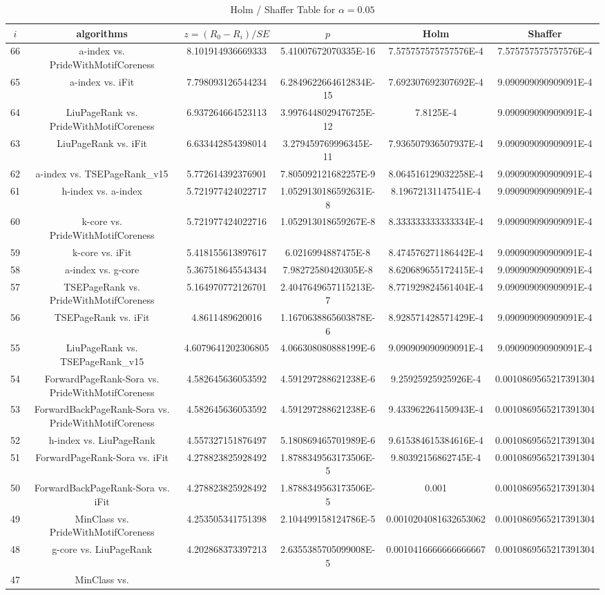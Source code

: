\documentclass[a4paper,10pt]{article}
\begin{document}
\begin{landscape}
\begin{table}[!htp]
\centering\tiny
\caption{Holm / Shaffer Table for $\alpha=0.05$}
\begin{tabular}{cccccc}
$i$&algorithms&$z=(R_0 - R_i)/SE$&$p$&Holm&Shaffer\\
\hline
66&a-index vs. PrideWithMotifCoreness&8.101914936669333&5.41007672070335E-16&7.575757575757576E-4&7.575757575757576E-4\\65&a-index vs. iFit&7.798093126544234&6.2849622664612834E-15&7.692307692307692E-4&9.090909090909091E-4\\64&LiuPageRank vs. PrideWithMotifCoreness&6.937264664523113&3.9976448029476725E-12&7.8125E-4&9.090909090909091E-4\\63&LiuPageRank vs. iFit&6.633442854398014&3.279459769996345E-11&7.936507936507937E-4&9.090909090909091E-4\\62&a-index vs. TSEPageRank_v15&5.772614392376901&7.805092121682257E-9&8.064516129032258E-4&9.090909090909091E-4\\61&h-index vs. a-index&5.721977424022717&1.0529130186592631E-8&8.19672131147541E-4&9.090909090909091E-4\\60&k-core vs. PrideWithMotifCoreness&5.721977424022716&1.052913018659267E-8&8.333333333333334E-4&9.090909090909091E-4\\59&k-core vs. iFit&5.418155613897617&6.0216994887475E-8&8.474576271186442E-4&9.090909090909091E-4\\58&a-index vs. g-core&5.367518645543434&7.98272580420305E-8&8.620689655172415E-4&9.090909090909091E-4\\57&TSEPageRank vs. PrideWithMotifCoreness&5.164970772126701&2.4047649657115213E-7&8.771929824561404E-4&9.090909090909091E-4\\56&TSEPageRank vs. iFit&4.8611489620016&1.1670638865603878E-6&8.928571428571429E-4&9.090909090909091E-4\\55&LiuPageRank vs. TSEPageRank_v15&4.6079641202306805&4.066308080888199E-6&9.090909090909091E-4&9.090909090909091E-4\\54&ForwardPageRank-Sora vs. PrideWithMotifCoreness&4.582645636053592&4.591297288621238E-6&9.25925925925926E-4&0.0010869565217391304\\53&ForwardBackPageRank-Sora vs. PrideWithMotifCoreness&4.582645636053592&4.591297288621238E-6&9.433962264150943E-4&0.0010869565217391304\\52&h-index vs. LiuPageRank&4.557327151876497&5.180869465701989E-6&9.615384615384616E-4&0.0010869565217391304\\51&ForwardPageRank-Sora vs. iFit&4.278823825928492&1.8788349563173506E-5&9.80392156862745E-4&0.0010869565217391304\\50&ForwardBackPageRank-Sora vs. iFit&4.278823825928492&1.8788349563173506E-5&0.001&0.0010869565217391304\\49&MinClass vs. PrideWithMotifCoreness&4.253505341751398&2.104499158124786E-5&0.0010204081632653062&0.0010869565217391304\\48&g-core vs. LiuPageRank&4.202868373397213&2.6355385705099008E-5&0.0010416666666666667&0.0010869565217391304\\47&MinClass vs. 
\end{tabular}
\end{table}
\end{landscape}
\end{document}
